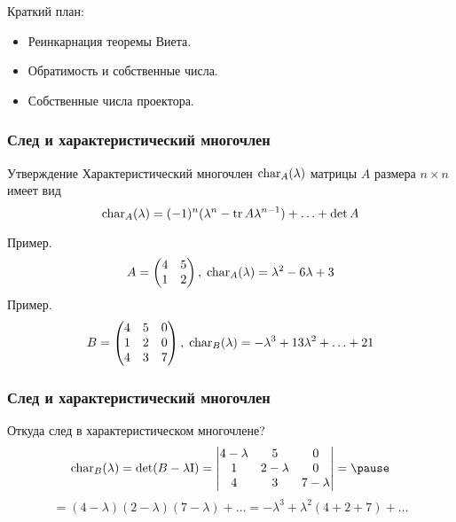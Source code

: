 
\begin{frame} %


\end{frame}



\begin{frame}{Краткий план:}
  \begin{itemize}[<+->]
    \item Реинкарнация теоремы Виета. 
    \item Обратимость и собственные числа.
    \item Собственные числа проектора.
  \end{itemize}

\end{frame}




\begin{frame}
    \frametitle{След и характеристический многочлен}


    \begin{block}{Утверждение}
        Характеристический многочлен $\operatorname{char}_A(\lambda)$ матрицы $A$ размера $n\times n$ имеет вид
        \[
            \charp_A(\lambda) = (-1)^n (\lambda^n - \trace A \lambda^{n-1}) + \ldots + \det A
        \]
        
    \end{block}
    \pause

    Пример. 
    \[
        A= \begin{pmatrix}
            4 & 5 \\
            1 & 2 \\
        \end{pmatrix}, \; \operatorname{char}_A(\lambda) = \lambda^2 - 6 \lambda + 3
    \]
    \pause
    Пример.
\[
    B= \begin{pmatrix}
        4 & 5 & 0 \\
        1 & 2 & 0 \\
        4 & 3 & 7 \\
    \end{pmatrix}, \; \operatorname{char}_B(\lambda) = -\lambda^3 + 13 \lambda^2 + \ldots + 21
\]


\end{frame}

\begin{frame}
    \frametitle{След и характеристический многочлен}

    Откуда след в характеристическом многочлене?
    \pause
    \[
    \charp_B(\lambda) = \det(B -\lambda\Id) = \begin{vmatrix}
        4 - \lambda & 5 & 0 \\
        1 & 2 - \lambda & 0 \\
        4 & 3 & 7 -\lambda \\
    \end{vmatrix} =   \pause
    \]
    \[
    = (4-\lambda)(2-\lambda)(7-\lambda) + \ldots = -\lambda^3 + \lambda^2 ( 4 + 2 + 7) + \ldots    
    \]
    

\end{frame}


